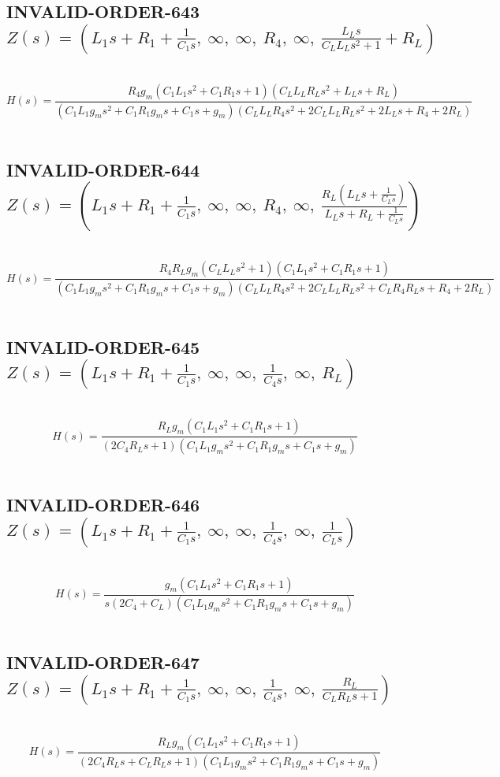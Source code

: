 \documentclass{article}
\begin{document}
\subsection{INVALID-ORDER-643 $Z(s) = \left( L_{1} s + R_{1} + \frac{1}{C_{1} s}, \  \infty, \  \infty, \  R_{4}, \  \infty, \  \frac{L_{L} s}{C_{L} L_{L} s^{2} + 1} + R_{L}\right)$ } \ 
\textbf{\[H(s) = \frac{R_{4} g_{m} \left(C_{1} L_{1} s^{2} + C_{1} R_{1} s + 1\right) \left(C_{L} L_{L} R_{L} s^{2} + L_{L} s + R_{L}\right)}{\left(C_{1} L_{1} g_{m} s^{2} + C_{1} R_{1} g_{m} s + C_{1} s + g_{m}\right) \left(C_{L} L_{L} R_{4} s^{2} + 2 C_{L} L_{L} R_{L} s^{2} + 2 L_{L} s + R_{4} + 2 R_{L}\right)}\] } \ 
\subsection{INVALID-ORDER-644 $Z(s) = \left( L_{1} s + R_{1} + \frac{1}{C_{1} s}, \  \infty, \  \infty, \  R_{4}, \  \infty, \  \frac{R_{L} \left(L_{L} s + \frac{1}{C_{L} s}\right)}{L_{L} s + R_{L} + \frac{1}{C_{L} s}}\right)$ } \ 
\textbf{\[H(s) = \frac{R_{4} R_{L} g_{m} \left(C_{L} L_{L} s^{2} + 1\right) \left(C_{1} L_{1} s^{2} + C_{1} R_{1} s + 1\right)}{\left(C_{1} L_{1} g_{m} s^{2} + C_{1} R_{1} g_{m} s + C_{1} s + g_{m}\right) \left(C_{L} L_{L} R_{4} s^{2} + 2 C_{L} L_{L} R_{L} s^{2} + C_{L} R_{4} R_{L} s + R_{4} + 2 R_{L}\right)}\] } \ 
\subsection{INVALID-ORDER-645 $Z(s) = \left( L_{1} s + R_{1} + \frac{1}{C_{1} s}, \  \infty, \  \infty, \  \frac{1}{C_{4} s}, \  \infty, \  R_{L}\right)$ } \ 
\textbf{\[H(s) = \frac{R_{L} g_{m} \left(C_{1} L_{1} s^{2} + C_{1} R_{1} s + 1\right)}{\left(2 C_{4} R_{L} s + 1\right) \left(C_{1} L_{1} g_{m} s^{2} + C_{1} R_{1} g_{m} s + C_{1} s + g_{m}\right)}\] } \ 
\subsection{INVALID-ORDER-646 $Z(s) = \left( L_{1} s + R_{1} + \frac{1}{C_{1} s}, \  \infty, \  \infty, \  \frac{1}{C_{4} s}, \  \infty, \  \frac{1}{C_{L} s}\right)$ } \ 
\textbf{\[H(s) = \frac{g_{m} \left(C_{1} L_{1} s^{2} + C_{1} R_{1} s + 1\right)}{s \left(2 C_{4} + C_{L}\right) \left(C_{1} L_{1} g_{m} s^{2} + C_{1} R_{1} g_{m} s + C_{1} s + g_{m}\right)}\] } \ 
\subsection{INVALID-ORDER-647 $Z(s) = \left( L_{1} s + R_{1} + \frac{1}{C_{1} s}, \  \infty, \  \infty, \  \frac{1}{C_{4} s}, \  \infty, \  \frac{R_{L}}{C_{L} R_{L} s + 1}\right)$ } \ 
\textbf{\[H(s) = \frac{R_{L} g_{m} \left(C_{1} L_{1} s^{2} + C_{1} R_{1} s + 1\right)}{\left(2 C_{4} R_{L} s + C_{L} R_{L} s + 1\right) \left(C_{1} L_{1} g_{m} s^{2} + C_{1} R_{1} g_{m} s + C_{1} s + g_{m}\right)}\] } \ 
\end{document}
